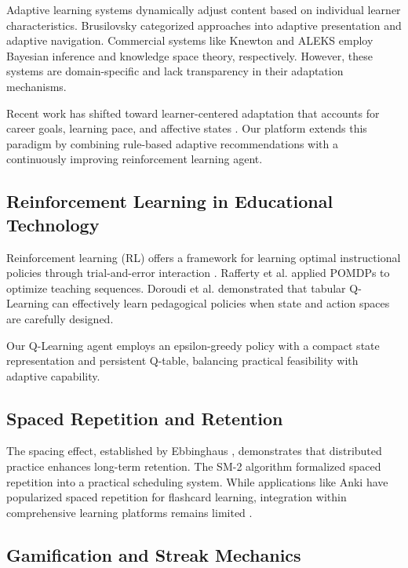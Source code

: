\documentclass[conference]{IEEEtran}
\begin{document}
Adaptive learning systems dynamically adjust content based on individual learner characteristics. Brusilovsky \cite{b9} categorized approaches into adaptive presentation and adaptive navigation. Commercial systems like Knewton \cite{b10} and ALEKS \cite{b11} employ Bayesian inference and knowledge space theory, respectively. However, these systems are domain-specific and lack transparency in their adaptation mechanisms.

Recent work has shifted toward learner-centered adaptation that accounts for career goals, learning pace, and affective states \cite{b12}. Our platform extends this paradigm by combining rule-based adaptive recommendations with a continuously improving reinforcement learning agent.

\subsection{Reinforcement Learning in Educational Technology}

Reinforcement learning (RL) offers a framework for learning optimal instructional policies through trial-and-error interaction \cite{b13}. Rafferty et al. \cite{b14} applied POMDPs to optimize teaching sequences. Doroudi et al. \cite{b15} demonstrated that tabular Q-Learning can effectively learn pedagogical policies when state and action spaces are carefully designed.

Our Q-Learning agent employs an epsilon-greedy policy with a compact state representation and persistent Q-table, balancing practical feasibility with adaptive capability.

\subsection{Spaced Repetition and Retention}

The spacing effect, established by Ebbinghaus \cite{b16}, demonstrates that distributed practice enhances long-term retention. The SM-2 algorithm \cite{b17} formalized spaced repetition into a practical scheduling system. While applications like Anki have popularized spaced repetition for flashcard learning, integration within comprehensive learning platforms remains limited \cite{b18}.

\subsection{Gamification and Streak Mechanics}
\end{document}
